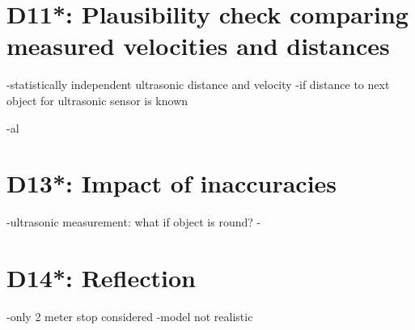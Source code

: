 \chapter{D11*: Plausibility check comparing measured velocities and distances}\label{cha:D11}
-statistically independent ultrasonic distance and velocity
-if distance to next object for ultrasonic sensor is known

-al
\chapter{D13*: Impact of inaccuracies}\label{cha:D13}
-ultrasonic measurement: what if object is round?
-
\chapter{D14*: Reflection}\label{cha:D14}
-only 2 meter stop considered
-model not realistic